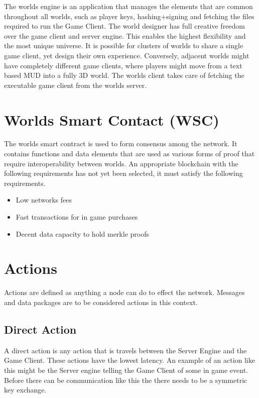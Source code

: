 \documentclass[runningheads,a4paper]{llncs}
\begin{document}
The worlds engine is an application that manages the elements that are common throughout all worlds, such as player keys, hashing+signing and fetching the files required to run the Game Client. The world designer has full creative freedom over the game client and server engine. This enables the highest flexibility and the most unique universe. It is possible for clusters of worlds to share a single game client, yet design their own experience. Conversely, adjacent worlds might have completely different game clients, where players might move from a text based MUD into a fully 3D world. The worlds client takes care of fetching the executable game client from the worlds server.

\section{Worlds Smart Contact (WSC)}
\label{WSC}
The worlds smart contract is used to form consensus among the network. It contains functions and data elements that are used as various forms of proof that require interoperability between worlds. An appropriate blockchain with the following requirements has not yet been selected, it must satisfy the following requirements. 

\begin{itemize}
\item{Low networks fees}
\item{Fast transactions for in game purchases}
\item{Decent data capacity to hold merkle proofs}
\end{itemize}

\section{Actions}
Actions are defined as anything a node can do to effect the network. Messages and data packages are to be considered actions in this context.

\subsection{Direct Action}
A direct action is any action that is travels between the Server Engine and the Game Client. These actions have the lowest latency. An example of an action like this might be the Server engine telling the Game Client of some in game event. Before there can be communication like this the there needs to be a symmetric key exchange. 
\end{document}
